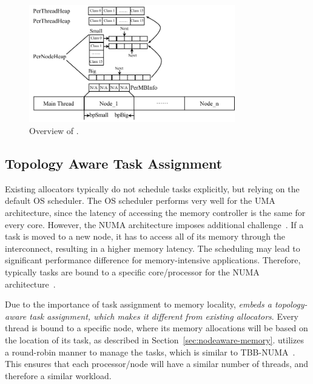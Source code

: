 \begin{figure}[h]
\begin{center}
\includegraphics[width=0.8\textwidth]{figure/heaplayout}
\end{center}
\vspace{-0.1in}
\caption{Overview of \NA{}.
\label{fig:overview}}
\vspace{-0.1in}
\end{figure}

\subsection{Topology Aware Task Assignment} 
\label{sec:taskassign}

Existing allocators typically do not schedule tasks explicitly, but relying on the default OS scheduler. The OS scheduler performs very well for the UMA architecture, since the latency of accessing the memory controller is the same for every core. However, the NUMA architecture imposes additional challenge~\cite{Majo:2015:LPC:2688500.2688509}. If a task is moved to a new node, it has to access all of its memory through the interconnect, resulting in a higher memory latency. The scheduling may lead to significant performance difference for memory-intensive applications. Therefore, typically tasks are bound to a specific core/processor for the NUMA architecture~\cite{terboven2012assessing, terboven2012task, Majo:2015:LPC:2688500.2688509}.  

Due to the importance of task assignment to  memory locality, \textit{\NA{} embeds a topology-aware task assignment, which makes it different from existing allocators}. Every thread is bound to a specific node, where its memory allocations will be based on the location of its task, as described in Section~\ref{sec:nodeaware-memory}. \NA{} utilizes a round-robin manner to manage the tasks, which is similar to TBB-NUMA~\cite{Majo:2015:LPC:2688500.2688509}. This ensures that each processor/node will have a similar number of threads, and therefore a similar workload. 

